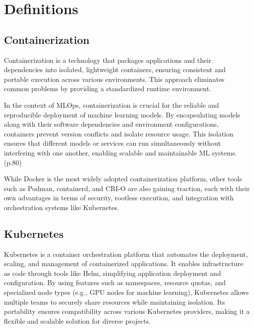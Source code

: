 \section{Definitions}\label{sec:definitions}

\subsection{Containerization}\label{subsec:containerization}

Containerization is a technology that packages applications and their dependencies into isolated, lightweight containers,
ensuring consistent and portable execution across various environments.
This approach eliminates common problems by providing a standardized runtime environment.

In the context of MLOps, containerization is crucial for the reliable and reproducible deployment of machine learning models.
By encapsulating models along with their software dependencies and environment configurations, containers prevent version conflicts and isolate resource usage.
This isolation ensures that different models or services can run simultaneously without interfering with one another,
enabling scalable and maintainable ML systems.\cite{treveil2020introducing}(p.80)

While Docker\cite{docker} is the most widely adopted containerization platform, other tools such as Podman, containerd,
and CRI-O are also gaining traction, each with their own advantages in terms of security, rootless execution,
and integration with orchestration systems like Kubernetes.


\subsection{Kubernetes}\label{subsec:kubernetes2}

Kubernetes\cite{kubernetes} is a container orchestration platform that automates the deployment, scaling, and management of containerized applications.
It enables infrastructure as code through tools like Helm, simplifying application deployment and configuration.
By using features such as namespaces, resource quotas, and specialized node types (e.g., GPU nodes for machine learning),
Kubernetes allows multiple teams to securely share resources while maintaining isolation.
Its portability ensures compatibility across various Kubernetes providers, making it a flexible and scalable solution for diverse projects.


